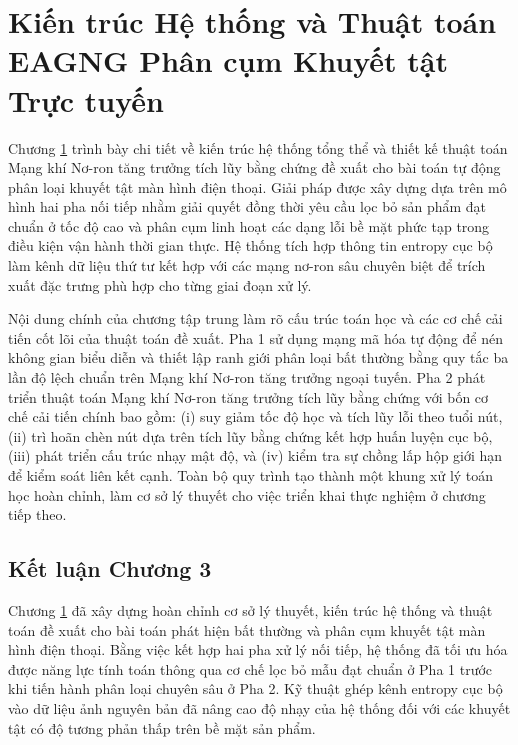 \chapter{Kiến trúc Hệ thống và Thuật toán EAGNG Phân cụm Khuyết tật Trực tuyến}
\label{chap:c3}

Chương \ref{chap:c3} trình bày chi tiết về kiến trúc hệ thống tổng thể và thiết kế thuật toán Mạng khí Nơ-ron tăng trưởng tích lũy bằng chứng đề xuất cho bài toán tự động phân loại khuyết tật màn hình điện thoại. Giải pháp được xây dựng dựa trên mô hình hai pha nối tiếp nhằm giải quyết đồng thời yêu cầu lọc bỏ sản phẩm đạt chuẩn ở tốc độ cao và phân cụm linh hoạt các dạng lỗi bề mặt phức tạp trong điều kiện vận hành thời gian thực. Hệ thống tích hợp thông tin entropy cục bộ làm kênh dữ liệu thứ tư kết hợp với các mạng nơ-ron sâu chuyên biệt để trích xuất đặc trưng phù hợp cho từng giai đoạn xử lý.

Nội dung chính của chương tập trung làm rõ cấu trúc toán học và các cơ chế cải tiến cốt lõi của thuật toán đề xuất. Pha 1 sử dụng mạng mã hóa tự động để nén không gian biểu diễn và thiết lập ranh giới phân loại bất thường bằng quy tắc ba lần độ lệch chuẩn trên Mạng khí Nơ-ron tăng trưởng ngoại tuyến. Pha 2 phát triển thuật toán Mạng khí Nơ-ron tăng trưởng tích lũy bằng chứng với bốn cơ chế cải tiến chính bao gồm: (i) suy giảm tốc độ học và tích lũy lỗi theo tuổi nút, (ii) trì hoãn chèn nút dựa trên tích lũy bằng chứng kết hợp huấn luyện cục bộ, (iii) phát triển cấu trúc nhạy mật độ, và (iv) kiểm tra sự chồng lấp hộp giới hạn để kiểm soát liên kết cạnh. Toàn bộ quy trình tạo thành một khung xử lý toán học hoàn chỉnh, làm cơ sở lý thuyết cho việc triển khai thực nghiệm ở chương tiếp theo.









\section*{Kết luận Chương 3}

Chương \ref{chap:c3} đã xây dựng hoàn chỉnh cơ sở lý thuyết, kiến trúc hệ thống và thuật toán đề xuất cho bài toán phát hiện bất thường và phân cụm khuyết tật màn hình điện thoại. Bằng việc kết hợp hai pha xử lý nối tiếp, hệ thống đã tối ưu hóa được năng lực tính toán thông qua cơ chế lọc bỏ mẫu đạt chuẩn ở Pha 1 trước khi tiến hành phân loại chuyên sâu ở Pha 2. Kỹ thuật ghép kênh entropy cục bộ vào dữ liệu ảnh nguyên bản đã nâng cao độ nhạy của hệ thống đối với các khuyết tật có độ tương phản thấp trên bề mặt sản phẩm.

